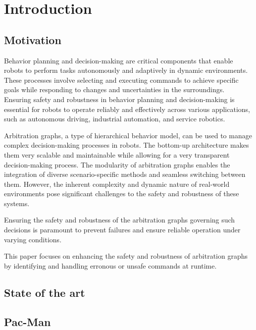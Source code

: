 \section{Introduction}

\subsection{Motivation}

Behavior planning and decision-making are critical components that enable robots to perform tasks autonomously and adaptively in dynamic environments.
These processes involve selecting and executing commands to achieve specific goals while responding to changes and uncertainties in the surroundings.
Ensuring safety and robustness in behavior planning and decision-making is essential for robots to operate reliably and effectively across various applications, such as autonomous driving, industrial automation, and service robotics.

Arbitration graphs, a type of hierarchical behavior model, can be used to manage complex decision-making processes in robots.
The bottom-up architecture makes them very scalable and maintainable while allowing for a very transparent decision-making process.
The modularity of arbitration graphs enables the integration of diverse scenario-specific methods and seamless switching between them.
However, the inherent complexity and dynamic nature of real-world environments pose significant challenges to the safety and robustness of these systems.

Ensuring the safety and robustness of the arbitration graphs governing such decisions is paramount to prevent failures and ensure reliable operation under varying conditions.

This paper focuses on enhancing the safety and robustness of arbitration graphs by identifying and handling erronous or unsafe commands at runtime.

\subsection{State of the art}

\subsection{Pac-Man}

